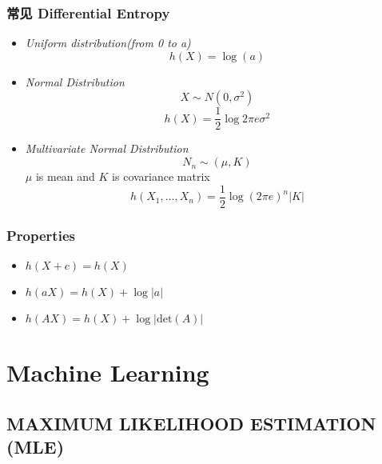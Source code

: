 \documentclass{article} 	%
\begin{document}
		\subsubsection{常见 Differential Entropy}
			\begin{itemize}
			       \item
            		       \emph{Uniform distribution(from 0 to a)}
                                \[
                                h(X) = \log(a)
                                \]
                                
                                \item
                                \emph{Normal Distribution}
                                \[
                                 X\sim N(0,\sigma^2)
                                 \]
                                 \[
                                 h(X) = \frac{1}{2} \log2\pi e \sigma^2 
                                \]
                                
                                \item
                                \emph{Multivariate Normal Distribution}
                                $$N_n\sim(\mu, K)$$
                                $\mu$ is mean and $K$ is covariance matrix
                                \[
                                h(X_1,\ldots,X_n) = \frac{1}{2}\log(2\pi e )^n |K|
                                \]
			\end{itemize}
			
		\subsubsection{Properties}
                        \begin{itemize}
                                \item $h(X+c) = h(X)$\\
                                \item$h(aX) = h(X) + \log|a|$\\
                                \item$h(AX) = h(X) + \log\big|\mathrm{det}(A)\big|$
                        \end{itemize}

\newpage
\section{Machine Learning}
	\subsection{MAXIMUM LIKELIHOOD ESTIMATION (MLE)}
\end{document}

